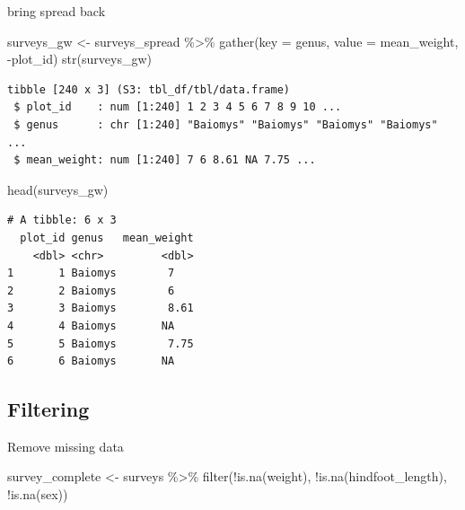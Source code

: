 \documentclass[
  letterpaper,
  DIV=11,
  numbers=noendperiod]{scrreprt}
\newenvironment{Shaded}{\begin{snugshade}}{\end{snugshade}}
\newcommand{\AttributeTok}[1]{\textcolor[rgb]{0.40,0.45,0.13}{#1}}
\newcommand{\FunctionTok}[1]{\textcolor[rgb]{0.28,0.35,0.67}{#1}}
\newcommand{\NormalTok}[1]{\textcolor[rgb]{0.00,0.23,0.31}{#1}}
\newcommand{\OtherTok}[1]{\textcolor[rgb]{0.00,0.23,0.31}{#1}}
\newcommand{\SpecialCharTok}[1]{\textcolor[rgb]{0.37,0.37,0.37}{#1}}
\begin{document}
bring spread back

\begin{Shaded}
\begin{Highlighting}[]
\NormalTok{surveys\_gw }\OtherTok{\textless{}{-}}\NormalTok{ surveys\_spread }\SpecialCharTok{\%\textgreater{}\%}
    \FunctionTok{gather}\NormalTok{(}\AttributeTok{key =}\NormalTok{ genus, }\AttributeTok{value =}\NormalTok{ mean\_weight, }\SpecialCharTok{{-}}\NormalTok{plot\_id)}
\FunctionTok{str}\NormalTok{(surveys\_gw)}
\end{Highlighting}
\end{Shaded}

\begin{verbatim}
tibble [240 x 3] (S3: tbl_df/tbl/data.frame)
 $ plot_id    : num [1:240] 1 2 3 4 5 6 7 8 9 10 ...
 $ genus      : chr [1:240] "Baiomys" "Baiomys" "Baiomys" "Baiomys" ...
 $ mean_weight: num [1:240] 7 6 8.61 NA 7.75 ...
\end{verbatim}

\begin{Shaded}
\begin{Highlighting}[]
\FunctionTok{head}\NormalTok{(surveys\_gw)}
\end{Highlighting}
\end{Shaded}

\begin{verbatim}
# A tibble: 6 x 3
  plot_id genus   mean_weight
    <dbl> <chr>         <dbl>
1       1 Baiomys        7   
2       2 Baiomys        6   
3       3 Baiomys        8.61
4       4 Baiomys       NA   
5       5 Baiomys        7.75
6       6 Baiomys       NA   
\end{verbatim}

\subsection{Filtering}\label{filtering}

Remove missing data

\begin{Shaded}
\begin{Highlighting}[]
\NormalTok{survey\_complete }\OtherTok{\textless{}{-}}\NormalTok{ surveys }\SpecialCharTok{\%\textgreater{}\%}
  \FunctionTok{filter}\NormalTok{(}\SpecialCharTok{!}\FunctionTok{is.na}\NormalTok{(weight), }\SpecialCharTok{!}\FunctionTok{is.na}\NormalTok{(hindfoot\_length), }\SpecialCharTok{!}\FunctionTok{is.na}\NormalTok{(sex))}
\end{Highlighting}
\end{Shaded}
\end{document}
